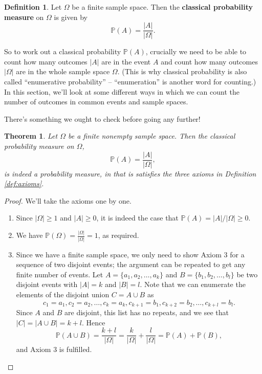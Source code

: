 \documentclass[
  a4paper,
]{book}
\providecommand{\tightlist}{%
  \setlength{\itemsep}{0pt}\setlength{\parskip}{0pt}}
\newtheorem{theorem}{Theorem}[chapter]
\theoremstyle{definition}
\newtheorem{definition}{Definition}[chapter]
\theoremstyle{definition}
\theoremstyle{definition}
\theoremstyle{definition}
\theoremstyle{remark}
\begin{document}
\begin{definition}
Let \(\Omega\) be a finite sample space. Then the \textbf{classical probability measure} on \(\Omega\) is given by
\[ \mathbb P(A) = \frac{|A|}{|\Omega|} . \]
\end{definition}

So to work out a classical probability \(\mathbb P(A)\), crucially we need to be able to count how many outcomes \(|A|\) are in the event \(A\) and count how many outcomes \(|\Omega|\) are in the whole sample space \(\Omega\). (This is why classical probability is also called ``enumerative probability'' -- ``enumeration'' is another word for counting.) In this section, we'll look at some different ways in which we can count the number of outcomes in common events and sample spaces.

There's something we ought to check before going any further!

\begin{theorem}
Let \(\Omega\) be a finite nonempty sample space. Then the classical probability measure on \(\Omega\),
\[ \mathbb P(A) = \frac{|A|}{|\Omega|} , \]
is indeed a probability measure, in that is satisfies the three axioms in Definition \ref{def:axioms}.
\end{theorem}

\begin{proof}

We'll take the axioms one by one.

\begin{enumerate}
\def\labelenumi{\arabic{enumi}.}
\tightlist
\item
  Since \(|\Omega| \geq 1\) and \(|A| \geq 0\), it is indeed the case that \(\mathbb P(A) = |A|/|\Omega| \geq 0\).
\item
  We have \({\displaystyle \mathbb P(\Omega) = \frac{|\Omega|}{|\Omega|} = 1}\), as required.
\item
  Since we have a finite sample space, we only need to show Axiom 3 for a sequence of two disjoint events; the argument can be repeated to get any finite number of events. Let \(A = \{a_1, a_2, \dots, a_k\}\) and \(B = \{b_1, b_2, \dots, b_l\}\) be two disjoint events with \(|A| = k\) and \(|B| = l\). Note that we can enumerate the elements of the disjoint union \(C = A \cup B\) as
  \[ c_1 = a_1, c_2 = a_2, \dots, c_k = a_k, c_{k+1} = b_1, c_{k+2} = b_2, \dots, c_{k+l} = b_l . \]
  Since \(A\) and \(B\) are disjoint, this list has no repeats, and we see that \(|C| = |A \cup B| = k+l\). Hence
  \[ \mathbb P(A \cup B) = \frac{k+l}{|\Omega|} = \frac{k}{|\Omega|} + \frac{l}{|\Omega|} = \mathbb P(A) + \mathbb P(B) , \]
  and Axiom 3 is fulfilled.
\end{enumerate}

\end{proof}
\end{document}
